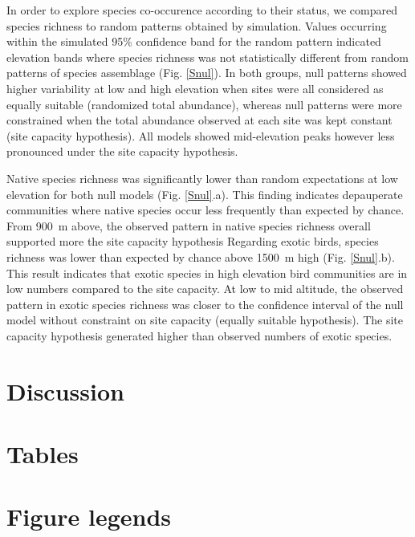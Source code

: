 \documentclass{article}\usepackage[]{graphicx}\usepackage[]{color}
\begin{document}
In order to explore species co-occurence according to their status, we compared species richness to random patterns obtained by simulation. Values occurring within the simulated 95\% confidence band for the random pattern indicated elevation bands where species richness was not statistically different from random patterns of species assemblage (Fig. \ref{Snul}). In both groups, null patterns showed higher variability at low and high elevation when sites were all considered as equally suitable (randomized total abundance), whereas null patterns were more constrained when the total abundance observed at each site was kept constant (site capacity hypothesis). All models showed mid-elevation peaks however less pronounced under the site capacity hypothesis.

Native species richness was significantly lower than random expectations at low elevation for both null models (Fig. \ref{Snul}.a). This finding indicates depauperate communities where native species occur less frequently than expected by chance.  From 900~m above, the observed pattern in native species richness overall supported more the site capacity hypothesis Regarding exotic birds, species richness was lower than expected by chance above 1500~m high (Fig. \ref{Snul}.b). This result indicates that exotic species in high elevation bird communities are in low numbers compared to the site capacity. At low to mid altitude, the observed pattern in exotic species richness was closer to the confidence interval of the null model without constraint on site capacity (equally suitable hypothesis). The site capacity hypothesis generated higher than observed numbers of exotic species. 


\section*{Discussion}

\section*{Tables}



\section*{Figure legends}
\end{document}

